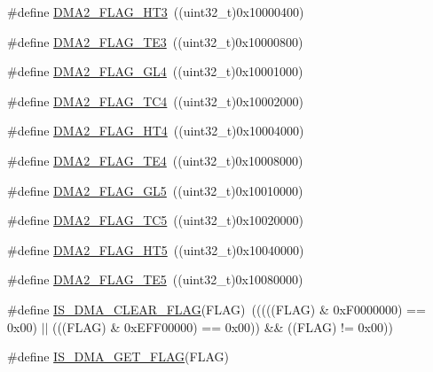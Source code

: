 \begin{DoxyCompactItemize}
\item 
\#define \hyperlink{group___d_m_a__flags__definition_ga1af48c549d9aa04e8161cb8b398ef39c}{D\+M\+A2\+\_\+\+F\+L\+A\+G\+\_\+\+H\+T3}~((uint32\+\_\+t)0x10000400)
\item 
\#define \hyperlink{group___d_m_a__flags__definition_gacdf472c665395a07681a7d499ac0f0bb}{D\+M\+A2\+\_\+\+F\+L\+A\+G\+\_\+\+T\+E3}~((uint32\+\_\+t)0x10000800)
\item 
\#define \hyperlink{group___d_m_a__flags__definition_ga624ff69707b76813a2170e4b1e0bda71}{D\+M\+A2\+\_\+\+F\+L\+A\+G\+\_\+\+G\+L4}~((uint32\+\_\+t)0x10001000)
\item 
\#define \hyperlink{group___d_m_a__flags__definition_gad4f76b7a22233dbb9daaad448c431165}{D\+M\+A2\+\_\+\+F\+L\+A\+G\+\_\+\+T\+C4}~((uint32\+\_\+t)0x10002000)
\item 
\#define \hyperlink{group___d_m_a__flags__definition_ga3dde40e2dbcdb12e4c1a2a2b5a8b3a60}{D\+M\+A2\+\_\+\+F\+L\+A\+G\+\_\+\+H\+T4}~((uint32\+\_\+t)0x10004000)
\item 
\#define \hyperlink{group___d_m_a__flags__definition_gac1178b804cad45fe82236dbd2c25cc64}{D\+M\+A2\+\_\+\+F\+L\+A\+G\+\_\+\+T\+E4}~((uint32\+\_\+t)0x10008000)
\item 
\#define \hyperlink{group___d_m_a__flags__definition_gab0468b7a6e2fbdd5428da87252865623}{D\+M\+A2\+\_\+\+F\+L\+A\+G\+\_\+\+G\+L5}~((uint32\+\_\+t)0x10010000)
\item 
\#define \hyperlink{group___d_m_a__flags__definition_ga5ba4dce652a1a29bedbd7d8dc35ca4ec}{D\+M\+A2\+\_\+\+F\+L\+A\+G\+\_\+\+T\+C5}~((uint32\+\_\+t)0x10020000)
\item 
\#define \hyperlink{group___d_m_a__flags__definition_ga23aabf34428e04d7b46368e0b595a4d5}{D\+M\+A2\+\_\+\+F\+L\+A\+G\+\_\+\+H\+T5}~((uint32\+\_\+t)0x10040000)
\item 
\#define \hyperlink{group___d_m_a__flags__definition_gae57659b4349d03eb70db63bb2aa40505}{D\+M\+A2\+\_\+\+F\+L\+A\+G\+\_\+\+T\+E5}~((uint32\+\_\+t)0x10080000)
\item 
\#define \hyperlink{group___d_m_a__flags__definition_ga4b33e418489c9a3c9adcbdbaca93e4a3}{I\+S\+\_\+\+D\+M\+A\+\_\+\+C\+L\+E\+A\+R\+\_\+\+F\+L\+AG}(F\+L\+AG)~(((((F\+L\+AG) \& 0x\+F0000000) == 0x00) $\vert$$\vert$ (((\+F\+L\+A\+G) \& 0x\+E\+F\+F00000) == 0x00)) \&\& ((\+F\+L\+A\+G) != 0x00))
\item 
\#define \hyperlink{group___d_m_a__flags__definition_ga98e421aa0a15fbeecb4cab3612985676}{I\+S\+\_\+\+D\+M\+A\+\_\+\+G\+E\+T\+\_\+\+F\+L\+AG}(F\+L\+AG)
\end{DoxyCompactItemize}


